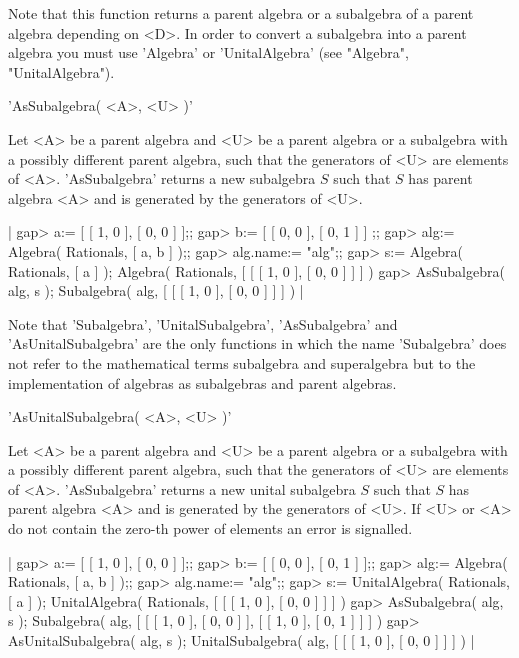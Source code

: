 Note that this function returns a parent algebra or a subalgebra  of a
parent algebra  depending on <D>. In order  to convert a   subalgebra
into a parent algebra you must use 'Algebra' or 'UnitalAlgebra' (see
"Algebra", "UnitalAlgebra").


'AsSubalgebra( <A>, <U> )'

Let <A> be a parent algebra and <U> be a parent algebra or a subalgebra
with a possibly different parent algebra, such that the generators of <U>
are elements of <A>.  'AsSubalgebra' returns a new subalgebra $S$ such
that $S$ has parent algebra <A> and is generated by the generators of <U>.

|    gap> a:= [ [ 1, 0 ], [ 0, 0 ] ];;
    gap> b:= [ [ 0, 0 ], [ 0, 1 ] ] ;;
    gap> alg:= Algebra( Rationals, [ a, b ] );;
    gap> alg.name:= "alg";;
    gap> s:= Algebra( Rationals, [ a ] );
    Algebra( Rationals, [ [ [ 1, 0 ], [ 0, 0 ] ] ] )
    gap> AsSubalgebra( alg, s );
    Subalgebra( alg, [ [ [ 1, 0 ], [ 0, 0 ] ] ] ) |

Note that 'Subalgebra', 'UnitalSubalgebra', 'AsSubalgebra' and
'AsUnitalSubalgebra' are the only functions in which the name
'Subalgebra' does not refer to the mathematical terms subalgebra and 
superalgebra but to the implementation of algebras as subalgebras and
parent algebras.


'AsUnitalSubalgebra( <A>, <U> )'

Let <A> be a parent algebra and <U> be a parent algebra or a subalgebra
with a possibly different parent algebra, such that the generators of <U>
are elements of <A>.  'AsSubalgebra' returns a new unital subalgebra $S$
such that $S$ has parent algebra <A> and is generated by the generators
of <U>.  If <U> or <A> do not contain the zero-th power of elements an
error is signalled.

|    gap> a:= [ [ 1, 0 ], [ 0, 0 ] ];;
    gap> b:= [ [ 0, 0 ], [ 0, 1 ] ];;
    gap> alg:= Algebra( Rationals, [ a, b ] );;
    gap> alg.name:= "alg";;
    gap> s:= UnitalAlgebra( Rationals, [ a ] );
    UnitalAlgebra( Rationals, [ [ [ 1, 0 ], [ 0, 0 ] ] ] )
    gap> AsSubalgebra( alg, s );
    Subalgebra( alg, [ [ [ 1, 0 ], [ 0, 0 ] ], [ [ 1, 0 ], [ 0, 1 ] ] ] )
    gap> AsUnitalSubalgebra( alg, s );
    UnitalSubalgebra( alg, [ [ [ 1, 0 ], [ 0, 0 ] ] ] ) |
    
